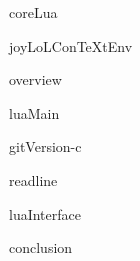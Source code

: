 
\usemodule[t-diSimp]

\startDiSimpComponent coreLua

\diSimpEnvironment joyLoLConTeXtEnv


\diSimpComponent overview

\diSimpComponent luaMain

\diSimpComponent gitVersion-c

\diSimpComponent readline

\diSimpComponent luaInterface

\diSimpComponent conclusion

\stopJoyLoLCoAlg

\stopDiSimpComponent

